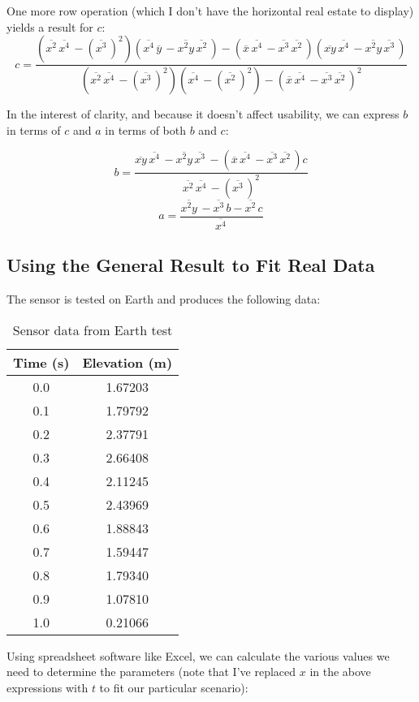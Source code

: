 \documentclass{article}
\newcommand{\ol}[1]{\overline{#1}\,} %
\begin{document}
One more row operation (which I don't have the horizontal real estate to display) yields a result for $c$:
\begin{equation}
c = \frac{(\ol{x^2}\ol{x^4} - (\ol{x^3})^2)(\ol{x^4}\ol{y} - \ol{x^2y}\ol{x^2}) - (\ol{x}\ol{x^4} - \ol{x^3}\ol{x^2})(\ol{xy}\ol{x^4} - \ol{x^2y}\ol{x^3})}{(\ol{x^2}\ol{x^4} - (\ol{x^3})^2)(\ol{x^4} - (\ol{x^2})^2) - (\ol{x}\ol{x^4} - \ol{x^3}\ol{x^2})^2}
\end{equation}

In the interest of clarity, and because it doesn't affect usability, we can express $b$ in terms of $c$ and $a$ in terms of both $b$ and $c$:

\begin{equation}
b = \frac{\ol{xy}\ol{x^4} - \ol{x^2y}\ol{x^3} - (\ol{x}\ol{x^4} - \ol{x^3}\ol{x^2})c}{\ol{x^2}\ol{x^4} - (\ol{x^3})^2}
\end{equation}
\begin{equation}
a = \frac{\ol{x^2y} - \ol{x^3}b - \ol{x^2}c}{\ol{x^4}}
\end{equation}

\subsection{Using the General Result to Fit Real Data}

The sensor is tested on Earth and produces the following data:

\begin{table}[H]
	\centering
	\begin{tabular}{cc}
		\toprule
		\textbf{Time (s)} & \textbf{Elevation (m)} \\
		\midrule
		0.0 & 1.67203 \\
		0.1 & 1.79792 \\
		0.2 & 2.37791 \\
		0.3 & 2.66408 \\
		0.4 & 2.11245 \\
		0.5 & 2.43969 \\
		0.6 & 1.88843 \\
		0.7 & 1.59447 \\
		0.8 & 1.79340 \\
		0.9 & 1.07810 \\
		1.0 & 0.21066 \\
		\bottomrule
	\end{tabular}
	\caption{Sensor data from Earth test}
\end{table}

Using spreadsheet software like Excel, we can calculate the various values we need to determine the parameters (note that I've replaced $x$ in the above expressions with $t$ to fit our particular scenario):
\end{document}
